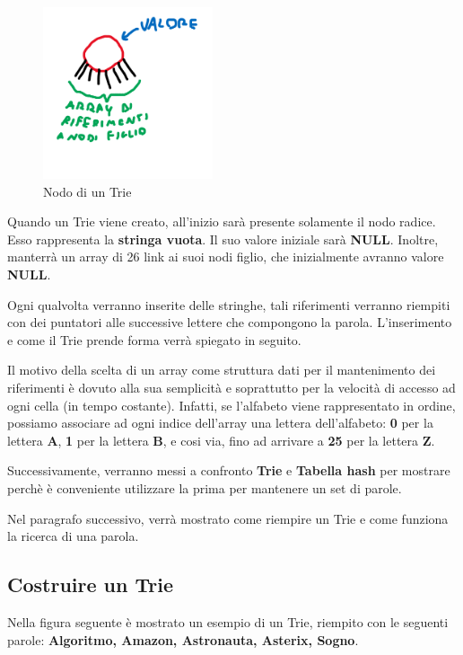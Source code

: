 \documentclass[a4paper, 12pt]{article}
\begin{document}
\begin{figure}[ht!]
    \centering
    \includegraphics[width=5cm]{Images/nodo trie.png}
    \caption{Nodo di un Trie}
    \label{fig:my_label}
\end{figure}

Quando un Trie viene creato, all'inizio sarà presente solamente il nodo radice. Esso rappresenta la \textbf{stringa vuota}. Il suo valore iniziale sarà \textbf{NULL}. Inoltre, manterrà un array di 26 link ai suoi nodi figlio, che inizialmente avranno valore \textbf{NULL}.

Ogni qualvolta verranno inserite delle stringhe, tali riferimenti verranno riempiti con dei puntatori alle successive lettere che compongono la parola. L'inserimento e come il Trie prende forma verrà spiegato in seguito.

Il motivo della scelta di un array come struttura dati per il mantenimento dei riferimenti è dovuto alla sua semplicità e soprattutto per la velocità di accesso ad ogni cella (in tempo costante). Infatti, se l'alfabeto viene rappresentato in ordine, possiamo associare ad ogni indice dell'array una lettera dell'alfabeto: \textbf{0} per la lettera \textbf{A}, \textbf{1} per la lettera \textbf{B}, e cosi via, fino ad arrivare a \textbf{25} per la lettera \textbf{Z}.

Successivamente, verranno messi a confronto \textbf{Trie} e \textbf{Tabella hash} per mostrare perchè è conveniente utilizzare la prima per mantenere un set di parole.

Nel paragrafo successivo, verrà mostrato come riempire un Trie e come funziona la ricerca di una parola.

\subsection{Costruire un Trie}
Nella figura seguente è mostrato un esempio di un Trie, riempito con le seguenti parole: \textbf{Algoritmo, Amazon, Astronauta, Asterix, Sogno}.
\end{document}
